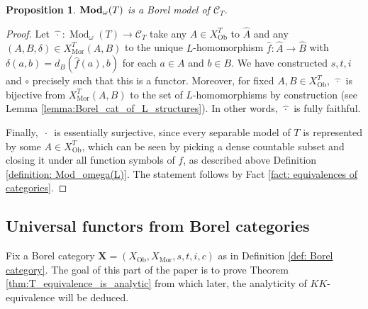\documentclass[12pt]{amsart}
\newtheorem{proposition}[theorem]{Proposition}
\DeclareMathOperator{\Mod}{Mod}
\DeclareMathOperator{\bfMod}{\bf{Mod}}
\DeclareMathOperator{\Mor}{Mor}
\DeclareMathOperator{\Ob}{Ob}
\newcommand{\theory}{T}
\begin{document}
\begin{proposition} \label{proposition: Borel model of the category of sigma}
        $\bfMod_\omega(\theory)$ is a Borel model of $\mathcal{C}_{\theory}$.
\end{proposition}
\begin{proof}
    Let $\widehat{\,\cdot\,}\colon \Mod_{\omega}(\theory) \to \mathcal{C}_{\theory}$ take any $A\in X^{\theory}_{\Ob}$ to $\widehat{A}$ and any $(A,B,\delta)\in X^{\theory}_{\Mor}(A,B)$ to the unique ${L}$-homomorphism $\widehat{f} \colon \widehat{A} \to \widehat{B}$ with $\delta(a,b)=d_B(\widehat{f}(a),b)$ for each $a\in A$ and $b\in B$. We have constructed $s,t,i$ and $\circ$ precisely such that this is a functor. Moreover, for fixed $A,B\in X^{\theory}_{\Ob}$, $\widehat{\,\cdot\,}$ is bijective from $X^{\theory}_{\Mor}(A,B)$ to the set of $L$-homomorphisms by construction (see Lemma \ref{lemma:Borel_cat_of_L_structures}). In other words, $\widehat{\,\cdot\,}$ is fully faithful.

    Finally, $\widehat{\,\cdot\,}$ is essentially surjective, since every separable model of $\theory$ is represented by some $A\in X^{\theory}_{\Ob}$, which can be seen by picking a dense countable subset and closing it under all function symbols of $f$, as described above Definition \ref{definition: Mod_omega(L)}. The statement follows by Fact \ref{fact: equivalences of categories}.
\end{proof}

\subsection{Universal functors from Borel categories}\label{subsection: analytic conditions}

Fix a Borel category $\mathbf{X} = (X_{\Ob},X_{\Mor},s,t,i,c)$ as in Definition \ref{def: Borel category}. The goal of this part of the paper is to prove Theorem \ref{thm:T_equivalence_is_analytic} from which later, the analyticity of $KK$-equivalence will be deduced.
\end{document}
